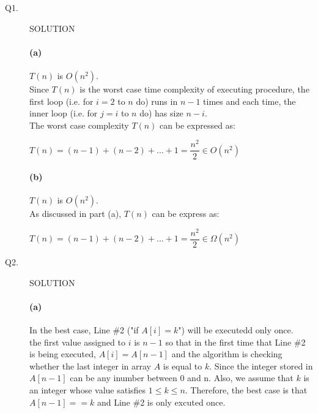 \documentclass[11pt]{csc_assignment}
\begin{document}
\begin{description}


\item[Q1.]


SOLUTION

\paragraph{(a)}
$ T(n) $ is $ O(n^{2}) $.\\
Since $ T(n) $ is the worst case time complexity of executing procedure, the first loop (i.e. for $ i=2 $ to $ n $ do) runs in $ n-1 $ times and each time, the inner loop (i.e. for $ j=i $ to $ n $ do) has size $ n-i $.\\
The worst case complexity $ T(n) $ can be expressed as:\\
\begin{center}
	$ T(n)=(n-1)+(n-2)+...+1=\dfrac{n^{2}}{2} \in O(n^{2}) $\\
\end{center} 
\paragraph{(b)}
$ T(n) $ is $ O(n^{2}) $.\\
As discussed in part (a), $ T(n) $ can be express as:
\begin{center}
	$ T(n)=(n-1)+(n-2)+...+1=\dfrac{n^{2}}{2} \in \Omega(n^{2}) $\\
\end{center} 



\newpage
\item[Q2.]


SOLUTION
\paragraph{(a)}
In the best case, Line \#2 ("if $ A[i]=k $") will be executedd only once.\\
the first value assigned to $ i $ is $ n-1 $ so that in the first time that Line \#2 is being executed, $ A[i]=A[n-1] $ and the algorithm is checking whether the last integer in array $ A $ is equal to $ k $. Since the integer stored in $ A[n-1] $ can be any inumber between 0 and n. Also, we assume that $ k $ is an integer whose value satisfies $ 1 \leq k\leq n $. Therefore, the best case is that $ A[n-1]==k $ and Line \#2 is only excuted once.\\

\end{description}
\end{document}
